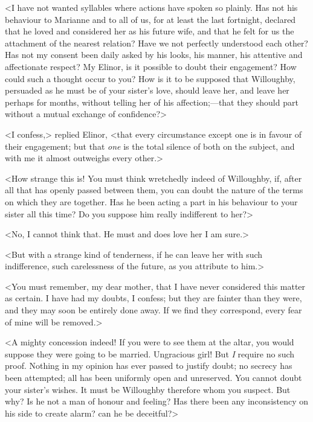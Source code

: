 <I have not wanted syllables where actions have spoken so plainly. Has not his behaviour to Marianne and to all of us, for at least the last fortnight, declared that he loved and considered her as his future wife, and that he felt for us the attachment of the nearest relation? Have we not perfectly understood each other? Has not my consent been daily asked by his looks, his manner, his attentive and affectionate respect? My Elinor, is it possible to doubt their engagement? How could such a thought occur to you? How is it to be supposed that Willoughby, persuaded as he must be of your sister's love, should leave her, and leave her perhaps for months, without telling her of his affection;—that they should part without a mutual exchange of confidence?>

<I confess,> replied Elinor, <that every circumstance except one is in favour of their engagement; but that \textit{one} is the total silence of both on the subject, and with me it almost outweighs every other.>

<How strange this is! You must think wretchedly indeed of Willoughby, if, after all that has openly passed between them, you can doubt the nature of the terms on which they are together. Has he been acting a part in his behaviour to your sister all this time? Do you suppose him really indifferent to her?>

<No, I cannot think that. He must and does love her I am sure.>

<But with a strange kind of tenderness, if he can leave her with such indifference, such carelessness of the future, as you attribute to him.>

<You must remember, my dear mother, that I have never considered this matter as certain. I have had my doubts, I confess; but they are fainter than they were, and they may soon be entirely done away. If we find they correspond, every fear of mine will be removed.>

<A mighty concession indeed! If you were to see them at the altar, you would suppose they were going to be married. Ungracious girl! But \textit{I} require no such proof. Nothing in my opinion has ever passed to justify doubt; no secrecy has been attempted; all has been uniformly open and unreserved. You cannot doubt your sister's wishes. It must be Willoughby therefore whom you suspect. But why? Is he not a man of honour and feeling? Has there been any inconsistency on his side to create alarm? can he be deceitful?>

